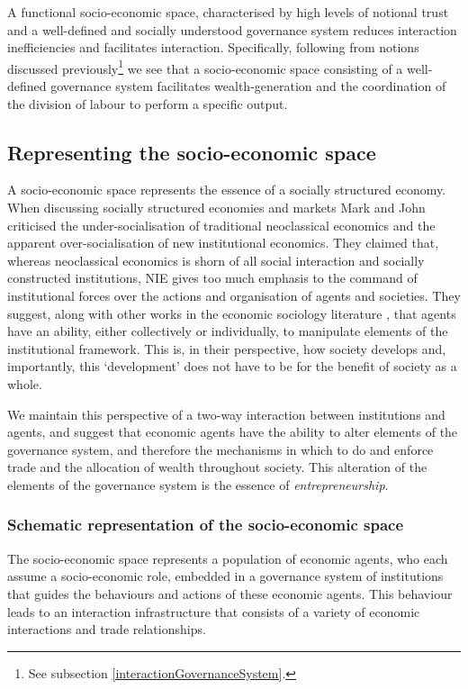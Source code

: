 A functional socio-economic space, characterised by high levels of notional trust and a well-defined and socially understood governance system reduces interaction inefficiencies and facilitates interaction. Specifically, following from notions discussed previously\footnote{See subsection \ref{interactionGovernanceSystem}. } we see that a socio-economic space consisting of a well-defined governance system facilitates wealth-generation and the coordination of the division of labour to perform a specific output.

\subsection{Representing the socio-economic space}

A socio-economic space represents the essence of a socially structured economy. When discussing socially structured economies and markets Mark \citet{Granovetter1985, Granovetter2005} and John \citet{Lie1997} criticised the under-socialisation of traditional neoclassical economics and the apparent over-socialisation of new institutional economics. They claimed that, whereas neoclassical economics is shorn of all social interaction and socially constructed institutions, NIE gives too much emphasis to the command of institutional forces over the actions and organisation of agents and societies. They suggest, along with other works in the economic sociology literature \citep{DiMaggio1988, Swedberg2000, Battilana2006}, that agents have an ability, either collectively or individually, to manipulate elements of the institutional framework. This is, in their perspective, how society develops and, importantly, this `development' does not have to be for the benefit of society as a whole.

We maintain this perspective of a two-way interaction between institutions and agents, and suggest that economic agents have the ability to alter elements of the governance system, and therefore the mechanisms in which to do and enforce trade and the allocation of wealth throughout society. This alteration of the elements of the governance system is the essence of \emph{entrepreneurship}.

\subsubsection{Schematic representation of the socio-economic space} \label{subsubsec:schematicRepresentation}

The socio-economic space represents a population of economic agents, who each assume a socio-economic role, embedded in a governance system of institutions that guides the behaviours and actions of these economic agents. This behaviour leads to an interaction infrastructure that consists of a variety of economic interactions and trade relationships.

